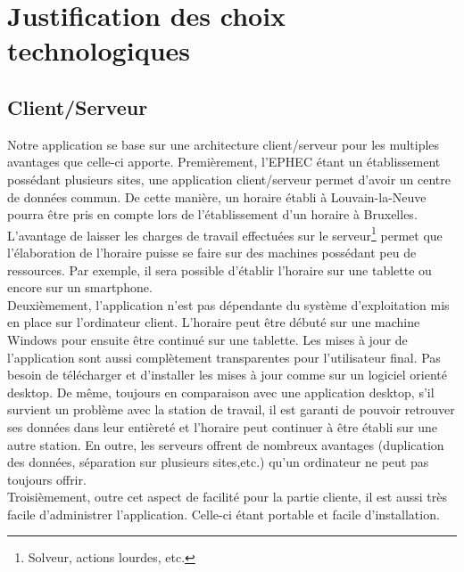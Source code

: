 
\chapter{Justification des choix technologiques}

\section{Client/Serveur}

Notre application se base sur une architecture client/serveur pour les multiples
avantages que celle-ci apporte.
\newline
\indent
Premièrement, l'EPHEC étant un établissement possédant plusieurs sites, une application client/serveur permet d'avoir un centre de données  commun.
 \newline
 \indent
 De cette manière, un horaire établi à Louvain-la-Neuve pourra être pris en
 compte lors de l'établissement d'un horaire à Bruxelles.
L'avantage de laisser les charges de travail effectuées sur le serveur\footnote{Solveur, actions lourdes, etc.} permet que l'élaboration de l'horaire puisse se
faire sur des machines possédant peu de ressources. Par exemple, il sera
possible d'établir l'horaire sur une tablette ou encore sur un smartphone.\\
\newline
\indent
Deuxièmement, l'application n'est pas dépendante du système
d'exploitation mis en place sur l'ordinateur client. L'horaire peut être débuté sur
une machine Windows pour ensuite être continué sur une tablette.
Les mises à jour de l'application sont aussi complètement transparentes pour
l'utilisateur final. Pas besoin de télécharger et d'installer les mises à jour
comme sur un logiciel orienté desktop.
\newline
\indent
De même, toujours en comparaison avec une application desktop, s'il survient un
problème avec la station de travail, il est garanti de pouvoir retrouver ses
données dans leur entièreté et l'horaire peut continuer à être établi
sur une autre station. En outre, les serveurs offrent de nombreux avantages (duplication des
données, séparation sur plusieurs sites,etc.) qu'un ordinateur ne peut pas toujours offrir.\\
\newline
\indent
Troisièmement, outre cet aspect de facilité pour la partie cliente, il est aussi très facile
d'administrer l'application. Celle-ci étant portable et facile d'installation.
